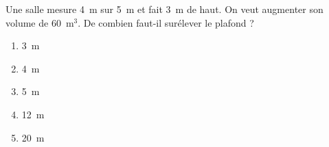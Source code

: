Une salle mesure 4~m sur 5~m et fait 3~m de haut. On veut augmenter son volume de 60~m$^3$. De combien faut-il surélever le plafond ?
\begin{multicols}{5}
  \begin{enumerate}[A/]
  \item 3~m
  \item 4~m
  \item 5~m
  \item 12~m
  \item 20~m
  \end{enumerate}
\end{multicols}